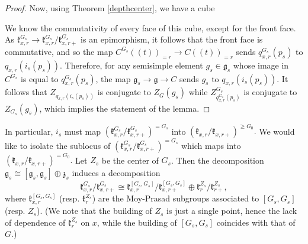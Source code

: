 \documentclass[12pt]{article}
\theoremstyle{remark}
\begin{document}
\begin{proof}
Now, using Theorem \ref{depthcenter}, we have a cube
\begin{center}
\end{center}
We know the commutativity of every face of this cube, except for the front face. As $\mathfrak{k}_{x,r}^{G_s}\rightarrow\mathfrak{k}_{x,r}^{G_s}/\mathfrak{k}_{x,r+}^{G_s}$ is an epimorphism, it follows that the front face is commutative, and so the map $C^{G_s}((t))_{=r}\rightarrow C((t))_{=r}$ sends $q_{x,r}^{G_s}(p_s)$ to $q_{x,r}(i_s(p_s))$. Therefore, for any semisimple element $g_s\in\mathfrak{g}_s$ whose image in $C^{G_s}$ is equal to $q_{x,r}^{G_s}(p_s)$, the map $\mathfrak{g}_s\rightarrow\mathfrak{g}\rightarrow C$ sends $g_s$ to $q_{x,r}(i_s(p_s))$. It follows that $Z_{q_{x,r}(i_s(p_s))}$ is conjugate to $Z_G(g_s)$ while $Z^{G_s}_{q_{x,r}^{G_s}(p_s)}$ is conjugate to $Z_{G_s}(g_s)$, which implies the statement of the lemma.
\end{proof}

In particular, $i_s$ must map $(\mathfrak{k}_{x,r}^{G_s}/\mathfrak{k}_{x,r+}^{G_s})^{=G_s}$ into $(\mathfrak{k}_{x,r}/\mathfrak{k}_{x,r+})^{\geq G_0}.$ We would like to isolate the sublocus of $(\mathfrak{k}_{x,r}^{G_s}/\mathfrak{k}_{x,r+}^{G_s})^{=G_s}$ which maps into $(\mathfrak{k}_{x,r}/\mathfrak{k}_{x,r+})^{= G_0}.$ Let $Z_s$ be the center of $G_s$. Then the decomposition $\mathfrak{g}_s\cong[\mathfrak{g}_s,\mathfrak{g}_s]\oplus\mathfrak{z}_s$ induces a decomposition
\[
\mathfrak{k}_{x,r}^{G_s}/\mathfrak{k}_{x,r+}^{G_s}\cong\mathfrak{k}_{x,r}^{[G_s,G_s]}/\mathfrak{k}_{x,r+}^{[G_s,G_s]}\oplus\mathfrak{k}_{r}^{Z_s}/\mathfrak{k}_{r+}^{Z_s},
\]
where $\mathfrak{k}_{x,r}^{[G_s,G_s]}$ (resp. $\mathfrak{k}_{r}^{Z_s}$) are the Moy-Prasad subgroups associated to $[G_s,G_s]$ (resp. $Z_s$). (We note that the building of $Z_s$ is just a single point, hence the lack of dependence of $\mathfrak{k}_{r}^{Z_s}$ on $x$, while the building of $[G_s,G_s]$ coincides with that of $G$.)
\end{document}
